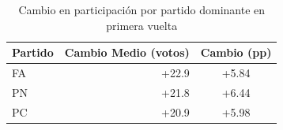 \begin{table}
\caption{Cambio en participación por partido dominante en primera vuelta}
\label{tab:turnout_dominant_party}
\begin{tabular}{lrc}
\toprule
Partido & Cambio Medio (votos) & Cambio (pp) \\
\midrule
FA & +22.9 & +5.84 \\
PN & +21.8 & +6.44 \\
PC & +20.9 & +5.98 \\
\bottomrule
\end{tabular}
\end{table}
